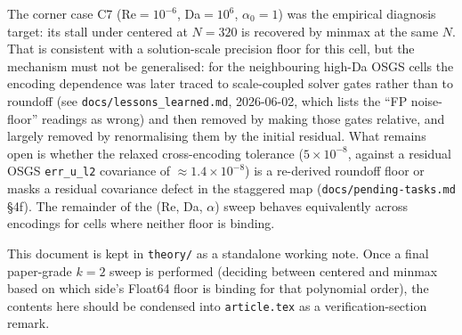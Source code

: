 \documentclass[11pt]{article}
\newcommand{\code}[1]{\texttt{#1}}
\begin{document}
The corner case C7 (Re$=10^{-6}$, Da$=10^{6}$, $\alpha_0=1$) was the
empirical diagnosis target: its stall under centered at $N=320$ is recovered
by minmax at the same $N$. That is consistent with a solution-scale precision
floor for this cell, but the mechanism must not be generalised: for the
neighbouring high-Da OSGS cells the encoding dependence was later traced to
scale-coupled solver gates rather than to roundoff (see
\code{docs/lessons\_learned.md}, 2026-06-02, which lists the
``FP noise-floor'' readings as wrong) and then removed by making those gates
relative, and largely removed by renormalising them by the initial residual. What
remains open is whether the relaxed cross-encoding tolerance ($5\times10^{-8}$,
against a residual OSGS \code{err\_u\_l2} covariance of
$\approx1.4\times10^{-8}$) is a re-derived roundoff floor or masks a residual
covariance defect in the staggered map (\code{docs/pending-tasks.md} \S4f). The remainder of the (Re, Da, $\alpha$) sweep behaves
equivalently across encodings for cells where neither floor is binding.

This document is kept in \texttt{theory/} as a standalone working
note. Once a final paper-grade $k=2$ sweep is performed (deciding
between centered and minmax based on which side's Float64 floor is
binding for that polynomial order), the contents here should be
condensed into \code{article.tex} as a verification-section remark.
\end{document}
